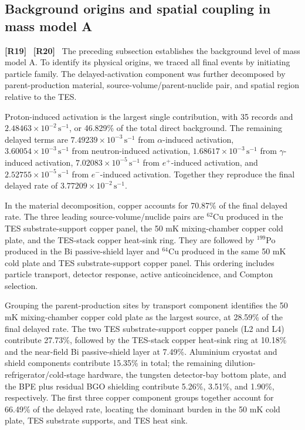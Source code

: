 \documentclass[11pt]{article}
\newcommand{\revmark}[1]{\textcolor{revisionblue}{\textbf{[R#1]}}\ }
\newcommand{\cps}{\ensuremath{\,\mathrm{s^{-1}}}}
\begin{document}
\subsection{Background origins and spatial coupling in mass model A}
\label{subsec:mass_model_a_origins}

\revmark{19}
\revmark{20}
\begingroup
\color{revisionblue}
The preceding subsection establishes the background level of mass model A. To identify its physical origins, we traced all final events by initiating particle family. The delayed-activation component was further decomposed by parent-production material, source-volume/parent-nuclide pair, and spatial region relative to the TES.

Proton-induced activation is the largest single contribution, with 35 records and $2.48463\times10^{-2}\cps$, or 46.829\% of the total direct background. The remaining delayed terms are $7.49239\times10^{-3}\cps$ from $\alpha$-induced activation, $3.60054\times10^{-3}\cps$ from neutron-induced activation, $1.68617\times10^{-3}\cps$ from $\gamma$-induced activation, $7.02083\times10^{-5}\cps$ from $e^+$-induced activation, and $2.52755\times10^{-5}\cps$ from $e^-$-induced activation. Together they reproduce the final delayed rate of $3.77209\times10^{-2}\cps$.

In the material decomposition, copper accounts for 70.87\% of the final delayed rate. The three leading source-volume/nuclide pairs are $^{62}$Cu produced in the TES substrate-support copper panel, the 50 mK mixing-chamber copper cold plate, and the TES-stack copper heat-sink ring. They are followed by $^{199}$Po produced in the Bi passive-shield layer and $^{64}$Cu produced in the same 50 mK cold plate and TES substrate-support copper panel. This ordering includes particle transport, detector response, active anticoincidence, and Compton selection.

Grouping the parent-production sites by transport component identifies the 50 mK mixing-chamber copper cold plate as the largest source, at 28.59\% of the final delayed rate. The two TES substrate-support copper panels (L2 and L4) contribute 27.73\%, followed by the TES-stack copper heat-sink ring at 10.18\% and the near-field Bi passive-shield layer at 7.49\%. Aluminium cryostat and shield components contribute 15.35\% in total; the remaining dilution-refrigerator/cold-stage hardware, the tungsten detector-bay bottom plate, and the BPE plus residual BGO shielding contribute 5.26\%, 3.51\%, and 1.90\%, respectively. The first three copper component groups together account for 66.49\% of the delayed rate, locating the dominant burden in the 50 mK cold plate, TES substrate supports, and TES heat sink.
\end{document}

